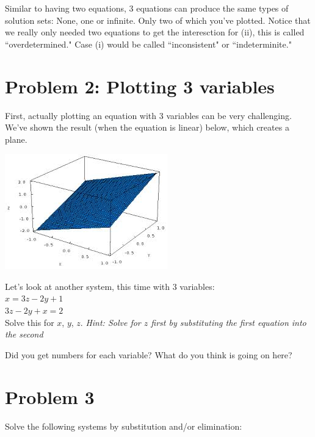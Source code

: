\documentclass{article}
\begin{document}
\begin{flushleft}
\vspace{4in}

Similar to having two equations, 3 equations can produce the same types of solution sets: None, one or infinite. Only two of which you've plotted. Notice that we really only needed two equations to get the interesction for (ii), this is called ``overdetermined." Case (i) would be called ``inconsistent" or ``indeterminite." 

\vspace{0.3in}
\newpage
\section*{Problem 2: Plotting 3 variables}
\vspace{0.1in}
First, actually plotting an equation with 3 variables can be very challenging.  We've shown the result (when the equation is linear) below, which creates a plane.\\

\vspace{0.1in}

\begin{center}
\includegraphics[scale=1.0]{planepic.png}
\end{center}

\vspace{0.1in}

Let's look at another system, this time with 3 variables:\\
$x=3z-2y+1$\\
$3z-2y+x=2$\\
Solve this for $x$, $y$, $z$. \textit{Hint: Solve for $z$ first by substituting the first equation into the second}\\

\vspace{4in}

Did you get numbers for each variable? What do you think is going on here?

\pagebreak

\section*{Problem 3}
Solve the following systems by substitution and/or elimination:


\end{flushleft}
\end{document}
